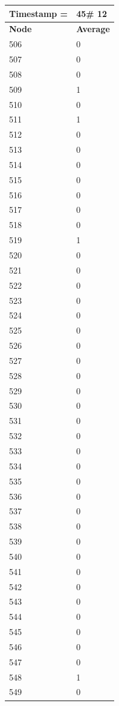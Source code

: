 \begin{tabular}{|l||l|}
\hline
\textbf{Timestamp =} & \textbf{45}\# 12\\\hline
	\textbf{Node} & \textbf{Average} \\ \hline
\hline
	506 & 0 \\ \hline
	507 & 0 \\ \hline
	508 & 0 \\ \hline
	509 & 1 \\ \hline
	510 & 0 \\ \hline
	511 & 1 \\ \hline
	512 & 0 \\ \hline
	513 & 0 \\ \hline
	514 & 0 \\ \hline
	515 & 0 \\ \hline
	516 & 0 \\ \hline
	517 & 0 \\ \hline
	518 & 0 \\ \hline
	519 & 1 \\ \hline
	520 & 0 \\ \hline
	521 & 0 \\ \hline
	522 & 0 \\ \hline
	523 & 0 \\ \hline
	524 & 0 \\ \hline
	525 & 0 \\ \hline
	526 & 0 \\ \hline
	527 & 0 \\ \hline
	528 & 0 \\ \hline
	529 & 0 \\ \hline
	530 & 0 \\ \hline
	531 & 0 \\ \hline
	532 & 0 \\ \hline
	533 & 0 \\ \hline
	534 & 0 \\ \hline
	535 & 0 \\ \hline
	536 & 0 \\ \hline
	537 & 0 \\ \hline
	538 & 0 \\ \hline
	539 & 0 \\ \hline
	540 & 0 \\ \hline
	541 & 0 \\ \hline
	542 & 0 \\ \hline
	543 & 0 \\ \hline
	544 & 0 \\ \hline
	545 & 0 \\ \hline
	546 & 0 \\ \hline
	547 & 0 \\ \hline
	548 & 1 \\ \hline
	549 & 0 \\ \hline
\end{tabular}

